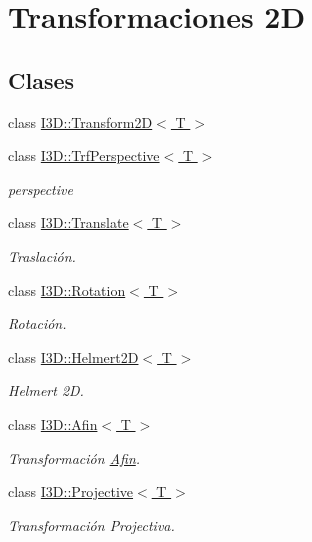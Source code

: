 \hypertarget{group__trf2_d_group}{}\section{Transformaciones 2D}
\label{group__trf2_d_group}
\subsection*{Clases}
\begin{DoxyCompactItemize}
\item 
class \hyperlink{class_i3_d_1_1_transform2_d}{I3\+D\+::\+Transform2\+D$<$ T $>$}
\item 
class \hyperlink{class_i3_d_1_1_trf_perspective}{I3\+D\+::\+Trf\+Perspective$<$ T $>$}
\begin{DoxyCompactList}\small\item\em perspective \end{DoxyCompactList}\item 
class \hyperlink{class_i3_d_1_1_translate}{I3\+D\+::\+Translate$<$ T $>$}
\begin{DoxyCompactList}\small\item\em Traslación. \end{DoxyCompactList}\item 
class \hyperlink{class_i3_d_1_1_rotation}{I3\+D\+::\+Rotation$<$ T $>$}
\begin{DoxyCompactList}\small\item\em Rotación. \end{DoxyCompactList}\item 
class \hyperlink{class_i3_d_1_1_helmert2_d}{I3\+D\+::\+Helmert2\+D$<$ T $>$}
\begin{DoxyCompactList}\small\item\em Helmert 2D. \end{DoxyCompactList}\item 
class \hyperlink{class_i3_d_1_1_afin}{I3\+D\+::\+Afin$<$ T $>$}
\begin{DoxyCompactList}\small\item\em Transformación \hyperlink{class_i3_d_1_1_afin}{Afin}. \end{DoxyCompactList}\item 
class \hyperlink{class_i3_d_1_1_projective}{I3\+D\+::\+Projective$<$ T $>$}
\begin{DoxyCompactList}\small\item\em Transformación Projectiva. \end{DoxyCompactList}\end{DoxyCompactItemize}
